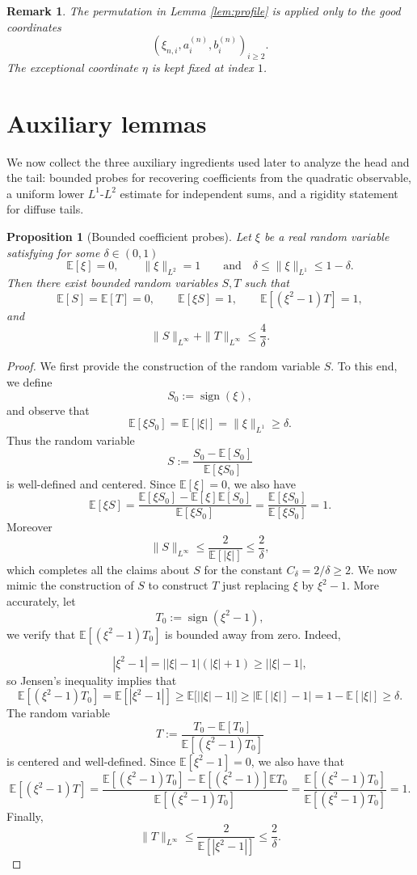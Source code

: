 \documentclass[11pt]{amsart}
\newtheorem{proposition}[theorem]{Proposition}
\newtheorem{remark}[theorem]{Remark}
\newcommand{\E}{\mathbb E}
\begin{document}
\begin{remark}
The permutation in Lemma \ref{lem:profile} is applied only to the good
coordinates
\[
(\xi_{n,i},a_i^{(n)},b_i^{(n)})_{i \ge 2}.
\]
The exceptional coordinate $\eta$ is kept fixed at index $1$.
\end{remark}

\section{Auxiliary lemmas}

We now collect the three auxiliary ingredients used later to analyze the head
and the tail: bounded probes for recovering coefficients from the quadratic
observable, a uniform lower $L^1$-$L^2$ estimate for independent sums, and a
rigidity statement for diffuse tails.

\begin{proposition}[Bounded coefficient probes]
\label{prop:bounded-probes}
Let $\xi$ be a real
random variable satisfying for some $\delta \in (0,1)$
\[
\E[\xi] = 0,
\qquad
\|\xi\|_{L^2}=1
\qquad
\text{and}  \quad 
\delta \le \|\xi\|_{L^1} \le 1-\delta.
\]
Then there exist bounded random variables $S,T$ such that
\[
\E[S] = \E[T] = 0,
\qquad
\E[\xi S] = 1,
\qquad
\E[(\xi^2-1)T] = 1,
\]
and
\[
\|S\|_{L^\infty}
+ \|T\|_{L^\infty}
\le \frac{4}{\delta}.
\]
\end{proposition}

\begin{proof}
We first provide the construction of the random variable $S$. To this end, we define
\[
S_0 := \operatorname{sign}(\xi),
\]
and observe that
\[
\E[\xi S_0] = \E[|\xi|] = \|\xi\|_{L^1} \ge \delta.
\]
Thus the random variable
\[
S := \frac{S_0 - \E[S_0]}{\E[\xi S_0]}
\]
is well-defined and centered. Since $\E [\xi]=0$, we also have
\[
\E[\xi S] = \frac{\E [\xi S_0]-\E[\xi]\E[S_0]}{\E[\xi S_0]} = \frac{\E [\xi S_0]}{\E [\xi S_0]}=1.
\]
Moreover
\[
\|S\|_{L^\infty}
\le
\frac{2}{\E[|\xi|]}
\le
\frac{2}{\delta},
\]
which completes all the claims about $S$ for the constant $C_{\delta}=2/\delta\ge 2$. We now mimic the construction of $S$ to construct $T$ just replacing $\xi$ by $\xi^2-1$. More accurately, let 
\[
T_0 := \operatorname{sign}(\xi^2-1),
\]
we verify that $\E[(\xi^2-1)T_0]$ is bounded away from zero. Indeed,

\[
|\xi^2-1|
=
\bigl||\xi|-1\bigr| (|\xi|+1)
\ge
\bigl||\xi|-1\bigr|,
\]
so Jensen's inequality implies that
\[
\E[(\xi^2-1)T_0]=\E[|\xi^2-1|]
\ge
\E\big[\bigl||\xi|-1\bigr|\big]
\ge
\bigl| \E[|\xi|] - 1 \bigr|
=
1-\E[|\xi|]
\ge
\delta.
\]
The random variable
\[
T := \frac{T_0 - \E[T_0]}{\E[(\xi^2-1)T_0]}
\]
is centered and well-defined. Since $\E[\xi^2-1]=0$, we also have that 
\[
\E[(\xi^2-1)T] = \frac{\E[(\xi^2-1)T_0]-\E[(\xi^2-1)]\E T_0}{\E[(\xi^2-1)T_0]} = \frac{\E[(\xi^2-1)T_0]}{\E[(\xi^2-1)T_0]}=1.
\]
Finally, 
\[
\|T\|_{L^\infty}
\le
\frac{2}{\E[|\xi^2-1|]}
\le
\frac{2}{\delta}.
\]
\end{proof}
\end{document}

